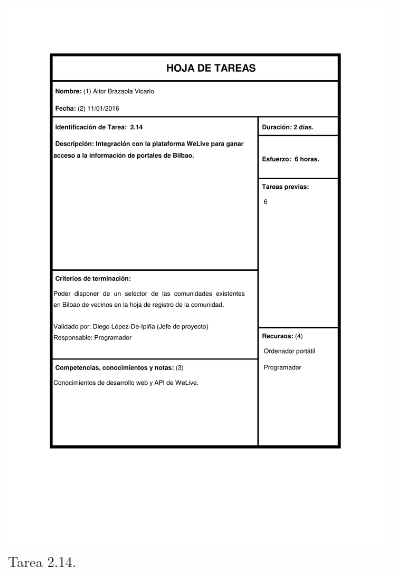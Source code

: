 \documentclass{DeustoFDP}
\begin{document}
\begin{figure}[H]
    \centering
    \includegraphics[width=0.9\textwidth]{fig/Tareas/214}
    \caption{Tarea 2.14.}
    \label{fig:t214}
\end{figure}
\end{document}
